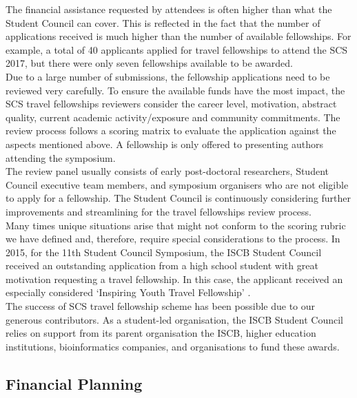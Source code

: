 \documentclass[]{article}%
\begin{document}
	The financial assistance requested by attendees is often higher than what the Student Council can cover. This is reflected in the fact that the number of applications received is much higher than the number of available fellowships. For example, a total of 40 applicants applied for travel fellowships to attend the SCS 2017, but there were only seven fellowships available to be awarded. \\
	
	Due to a large number of submissions, the fellowship applications need to be reviewed very carefully. To ensure the available funds have the most impact, the SCS travel fellowships reviewers consider the career level, motivation, abstract quality, current academic activity/exposure and community commitments. The review process follows a scoring matrix to evaluate the application against the aspects mentioned above. A fellowship is only offered to presenting authors attending the symposium. \\
	
	The review panel usually consists of early post-doctoral researchers, Student Council executive team members, and symposium organisers who are not eligible to apply for a fellowship. The Student Council is continuously considering further improvements and streamlining for the travel fellowships review process. \\
	
	Many times unique situations arise that might not conform to the scoring rubric we have defined and, therefore, require special considerations to the process. In 2015, for the 11th Student Council Symposium, the ISCB Student Council received an outstanding application from a high school student with great motivation requesting a travel fellowship.  In this case, the applicant received an especially considered `Inspiring Youth Travel Fellowship' \citep{Wilkins2016}.\\
	
	The success of SCS travel fellowship scheme has been possible due to our generous contributors. As a student-led organisation, the ISCB Student Council relies on support from its parent organisation the ISCB, higher education institutions, bioinformatics companies, and organisations to fund these awards.\\
	
	
	\subsection*{Financial Planning}
	
\end{document}
